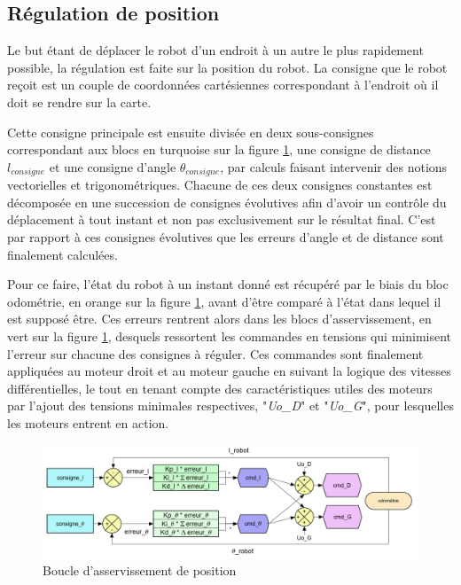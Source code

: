 \documentclass[a4paper,11pt]{article}
\begin{document}
\subsection{\label{ptregpos}Régulation de position}

Le but étant de déplacer le robot d'un endroit à un autre le plus rapidement possible, la régulation est faite sur la position du robot. La consigne que le robot reçoit est un couple de coordonnées cartésiennes correspondant à l'endroit où il doit se rendre sur la carte.

Cette consigne principale est ensuite divisée en deux sous-consignes correspondant aux blocs en turquoise sur la figure \ref{fig:boucle}, une consigne de distance $l_{consigne}$ et une consigne d'angle $\theta_{consigne}$, par calculs faisant intervenir des notions vectorielles et trigonométriques. Chacune de ces deux consignes constantes est décomposée en une succession de consignes évolutives afin d'avoir un contrôle du déplacement à tout instant et non pas exclusivement sur le résultat final. C'est par rapport à ces consignes évolutives que les erreurs d'angle et de distance sont finalement calculées.

Pour ce faire, l'état du robot à un instant donné est récupéré par le biais du bloc odométrie, en orange sur la figure \ref{fig:boucle}, avant d'être comparé à l'état dans lequel il est supposé être. Ces erreurs rentrent alors dans les blocs d'asservissement, en vert sur la figure \ref{fig:boucle}, desquels ressortent les commandes en tensions qui minimisent l'erreur sur chacune des consignes à réguler. Ces commandes sont finalement appliquées au moteur droit et au moteur gauche en suivant la logique des vitesses différentielles, le tout en tenant compte des caractéristiques utiles des moteurs par l'ajout des tensions minimales respectives, "\textit{Uo\_D}"  et  "\textit{Uo\_G}", pour lesquelles les moteurs entrent en action.

\begin{figure}[H]
    \centering
    \includegraphics[scale = 0.55]{Capture.PNG}
    \caption{Boucle d'asservissement de position}
    \label{fig:boucle}
\end{figure}
\end{document}
